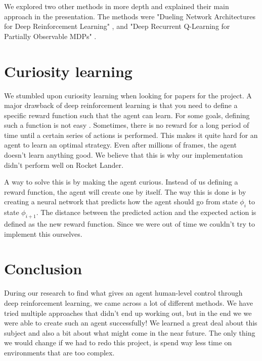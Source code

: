 \documentclass[12pt, conference, compsoc]{IEEEtran}
\begin{document}
We explored two other methods in more depth and explained their main approach in the presentation. The methods were "Dueling Network Architectures for Deep Reinforcement Learning" \cite{dueling}, and "Deep Recurrent Q-Learning for Partially Observable MDPs" \cite{drqn}.

\section{Curiosity learning}
We stumbled upon curiosity learning when looking for papers for the project. A major drawback of deep reinforcement learning is that you need to define a specific reward function such that the agent can learn. For some goals, defining such a function is not easy \cite{YoutubeMontezuma}. Sometimes, there is no reward for a long period of time until a certain series of actions is performed. This makes it quite hard for an agent to learn an optimal strategy. Even after millions of frames, the agent doesn't learn anything good. We believe that this is why our implementation didn't perform well on Rocket Lander.

A way to solve this is by making the agent curious. Instead of us defining a reward function, the agent will create one by itself. The way this is done is by creating a neural network that predicts how the agent should go from state $\phi_i$ to state $\phi_{i+1}$. The distance between the predicted action and the expected action is defined as the new reward function. Since we were out of time we couldn't try to implement this ourselves.

\section{Conclusion}
During our research to find what gives an agent human-level control through deep reinforcement learning, we came across a lot of different methods. We have tried multiple approaches that didn't end up working out, but in the end we we were able to create such an agent successfully! We learned a great deal about this subject and also a bit about what might come in the near future. The only thing we would change if we had to redo this project, is spend way less time on environments that are too complex.
\end{document}
